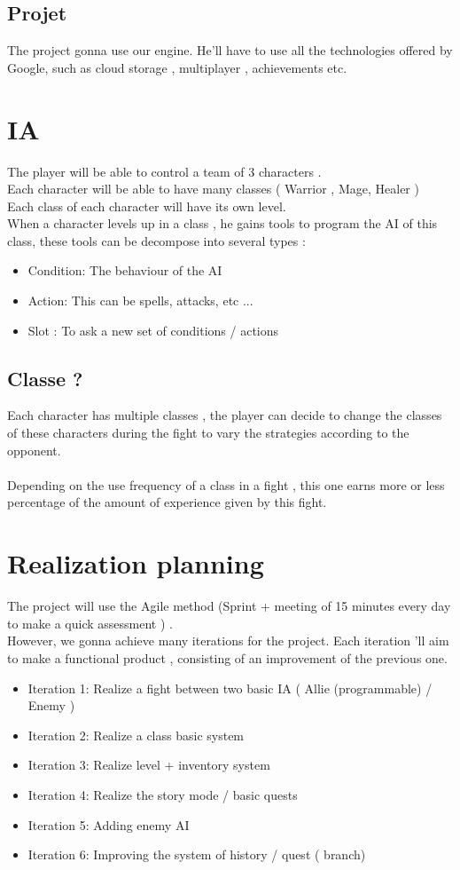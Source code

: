 \documentclass[16pt, oneside]{report}
\begin{document}
\section{Projet}
The project gonna use our engine. He'll have to use all the technologies offered by Google, such as cloud storage , multiplayer , achievements  etc.

\chapter{IA}
The player will be able to control a team of 3 characters . \\
Each character will be able to have many classes ( Warrior , Mage, Healer ) \\
Each class of each character will have its own level. \\
When a character levels up in a class , he gains tools to program the AI of this class, these tools can be decompose into several types :
\begin {itemize}
\item Condition: The behaviour of the AI
\item Action: This can be spells, attacks, etc ...
\item Slot : To ask a new set of conditions / actions
\end {itemize}

\section{Classe ?}
Each character has multiple classes , the player can decide to change the classes of these characters during the fight to vary the strategies according to the opponent.\\\\
Depending on the use frequency of a class in a fight , this one earns more or less percentage of the amount of experience given by this fight.

\chapter{Realization planning}
The project will use the Agile method (Sprint + meeting of 15 minutes every day to make a quick assessment ) . \\
However, we gonna achieve many iterations for the project. Each iteration 'll aim to make a functional product , consisting of an improvement of the previous one.
\begin{itemize}
\item Iteration 1: Realize a fight between two basic IA ( Allie (programmable) / Enemy )
\item Iteration 2: Realize a class basic system
\item Iteration 3: Realize level + inventory system
\item Iteration 4: Realize the story mode / basic quests
\item Iteration 5: Adding enemy AI
\item Iteration 6: Improving the system of history / quest ( branch)
\end{itemize}
\end{document}
